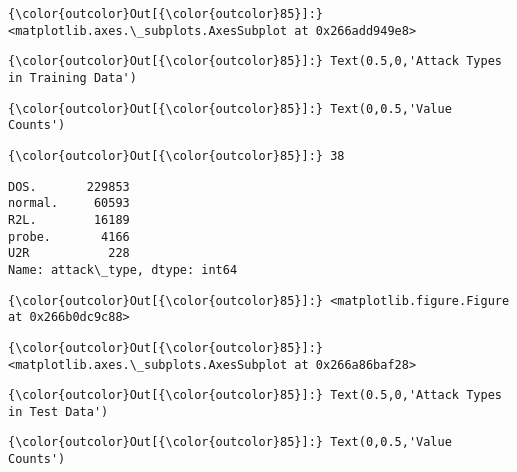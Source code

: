\documentclass[11pt]{article}
\begin{document}
\begin{Verbatim}[commandchars=\\\{\}]
{\color{outcolor}Out[{\color{outcolor}85}]:} <matplotlib.axes.\_subplots.AxesSubplot at 0x266add949e8>
\end{Verbatim}
            
\begin{Verbatim}[commandchars=\\\{\}]
{\color{outcolor}Out[{\color{outcolor}85}]:} Text(0.5,0,'Attack Types in Training Data')
\end{Verbatim}
            
\begin{Verbatim}[commandchars=\\\{\}]
{\color{outcolor}Out[{\color{outcolor}85}]:} Text(0,0.5,'Value Counts')
\end{Verbatim}
            
\begin{Verbatim}[commandchars=\\\{\}]
{\color{outcolor}Out[{\color{outcolor}85}]:} 38
\end{Verbatim}
            
    \begin{Verbatim}[commandchars=\\\{\}]
DOS.       229853
normal.     60593
R2L.        16189
probe.       4166
U2R           228
Name: attack\_type, dtype: int64

    \end{Verbatim}

\begin{Verbatim}[commandchars=\\\{\}]
{\color{outcolor}Out[{\color{outcolor}85}]:} <matplotlib.figure.Figure at 0x266b0dc9c88>
\end{Verbatim}
            
\begin{Verbatim}[commandchars=\\\{\}]
{\color{outcolor}Out[{\color{outcolor}85}]:} <matplotlib.axes.\_subplots.AxesSubplot at 0x266a86baf28>
\end{Verbatim}
            
\begin{Verbatim}[commandchars=\\\{\}]
{\color{outcolor}Out[{\color{outcolor}85}]:} Text(0.5,0,'Attack Types in Test Data')
\end{Verbatim}
            
\begin{Verbatim}[commandchars=\\\{\}]
{\color{outcolor}Out[{\color{outcolor}85}]:} Text(0,0.5,'Value Counts')
\end{Verbatim}
            
\end{document}
